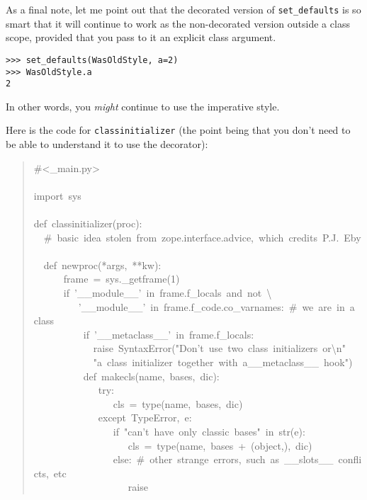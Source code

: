 \documentclass[10pt,a4paper,english]{article}
\begin{document}
As a final note, let me point out that the decorated version of
\texttt{set{\_}defaults} is so smart  that it will continue to
work as the non-decorated version outside a class scope, provided that
you pass to it an explicit class argument.
\begin{verbatim}>>> set_defaults(WasOldStyle, a=2)
>>> WasOldStyle.a
2\end{verbatim}

In other words, you \emph{might} continue to use the imperative style.

Here is the code for \texttt{classinitializer} (the point being that you
don't need to be able to understand it to use the decorator):
\begin{quote}{\ttfamily \raggedright \noindent
{\#}<{\_}main.py>~\\
~\\
import~sys~\\
~\\
def~classinitializer(proc):~\\
~~{\#}~basic~idea~stolen~from~zope.interface.advice,~which~credits~P.J.~Eby~\\
~~def~newproc(*args,~**kw):~\\
~~~~~~frame~=~sys.{\_}getframe(1)~\\
~~~~~~if~'{\_}{\_}module{\_}{\_}'~in~frame.f{\_}locals~and~not~{\textbackslash}~\\
~~~~~~~~~'{\_}{\_}module{\_}{\_}'~in~frame.f{\_}code.co{\_}varnames:~{\#}~we~are~in~a~class~\\
~~~~~~~~~~if~'{\_}{\_}metaclass{\_}{\_}'~in~frame.f{\_}locals:~\\
~~~~~~~~~~~~raise~SyntaxError("Don't~use~two~class~initializers~or{\textbackslash}n"~\\
~~~~~~~~~~~~"a~class~initializer~together~with~a{\_}{\_}metaclass{\_}{\_}~hook")~\\
~~~~~~~~~~def~makecls(name,~bases,~dic):~\\
~~~~~~~~~~~~~try:~\\
~~~~~~~~~~~~~~~~cls~=~type(name,~bases,~dic)~\\
~~~~~~~~~~~~~except~TypeError,~e:~\\
~~~~~~~~~~~~~~~~if~"can't~have~only~classic~bases"~in~str(e):~\\
~~~~~~~~~~~~~~~~~~~cls~=~type(name,~bases~+~(object,),~dic)~\\
~~~~~~~~~~~~~~~~else:~{\#}~other~strange~errors,~such~as~{\_}{\_}slots{\_}{\_}~conflicts,~etc~\\
~~~~~~~~~~~~~~~~~~~raise~\\
}
\end{quote}
\end{document}
